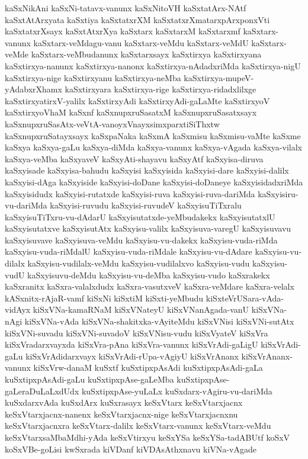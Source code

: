 {kaSxNikAni
kaSxNi-tatavx-vanunx
kaSxNitoVH
kaSxtatArx-NAtf
kaSxtAtArxyata
kaSxtiya
kaSxtatxrXM
kaSxtatxrXmatarxpArxponxVti
kaSxtatxrXsayx
kaSxtAtxrXya
kaSxtarx
kaSxtarxM
kaSxtarxmf
kaSxtarx-vanunx
kaSxtarx-veMdagu-vanu
kaSxtarx-veMdu
kaSxtarx-veMdU
kaSxtarx-veMde
kaSxtarx-veMbudanunx
kaSxtarxsayx
kaSxtirxya
kaSxtirxyana
kaSxtirxya-nanunx
kaSxtirxya-nanonx
kaSxtirxya-nAdadxriMda
kaSxtirxya-nigU
kaSxtirxya-nige
kaSxtirxyanu
kaSxtirxya-neMba
kaSxtirxya-mupeV-yAdabxrXhamx
kaSxtirxyara
kaSxtirxya-rige
kaSxtirxya-ridadxlilxge
kaSxtirxyatirxV-yalilx
kaSxtirxyAdi
kaSxtirxyAdi-gaLaMte
kaSxtirxyoV
kaSxtirxyoVhaM
kaSxnf
kaSxnupxruSasatxM
kaSxnupxruSasatxsayx
kaSxnupxruSasAtx-veVtA-vanoyxVnayxsimxparxtiSiThxtw
kaSxnupxruSatayxsayx
kaSxpaNaka
kaSxmA
kaSxmisu
kaSxmisu-vaMte
kaSxme
kaSxya
kaSxya-gaLu
kaSxya-diMda
kaSxya-vanunx
kaSxya-vAgada
kaSxya-vilalx
kaSxya-veMba
kaSxyaveV
kaSxyAti-shayavu
kaSxyAtf
kaSxyisa-diruva
kaSxyisade
kaSxyisa-bahudu
kaSxyisi
kaSxyisida
kaSxyisi-dare
kaSxyisi-dalilx
kaSxyisi-dAga
kaSxyiside
kaSxyisi-doDane
kaSxyisi-doDaneye
kaSxyisidadxriMda
kaSxyisidudx
kaSxyisi-rutatxde
kaSxyisi-ruva
kaSxyisi-ruva-dariMda
kaSxyisiru-vu-dariMda
kaSxyisi-ruvudu
kaSxyisi-ruvudeV
kaSxyisuTiTxralu
kaSxyisuTiTxru-vu-dAdarU
kaSxyisutatxde-yeMbudakekx
kaSxyisutatxlU
kaSxyisutatxve
kaSxyisutAtx
kaSxyisu-valilx
kaSxyisuva-varegU
kaSxyisuvavu
kaSxyisuvave
kaSxyisuva-veMdu
kaSxyisu-vu-dakekx
kaSxyisu-vuda-riMda
kaSxyisu-vuda-riMdalU
kaSxyisu-vuda-riMdale
kaSxyisu-vu-dAdare
kaSxyisu-vu-dilalx
kaSxyisu-vudilalx-veMdu
kaSxyisu-vudilalxvo
kaSxyisu-vudu
kaSxyisu-vudU
kaSxyisuvu-deMdu
kaSxyisu-vu-deMba
kaSxyisu-vudo
kaSxrakekx
kaSxranitx
kaSxra-valalxdudx
kaSxra-vasutxveV
kaSxra-veMdare
kaSxra-velalx
kASxnitx-rAjaR-vamf
kiSxNi
kiSxtiM
kiSxti-yeMbudu
kiSxteVrUSara-vAda-vidAyx
kiSxVNa-kamaRNaM
kiSxVNateyU
kiSxVNanAgada-vanU
kiSxVNa-nAgi
kiSxVNa-vAda
kiSxVNa-shakitxka-vAyiteMdu
kiSxVNisi
kiSxVNi-sutAtx
kiSxVNi-suvadu
kiSxVNi-suvadoV
kiSxVNisu-vudu
kiSxVyateV
kiSxVra
kiSxVradarxvayxda
kiSxVra-pAna
kiSxVra-vanunx
kiSxVrAdi-gaLigU
kiSxVrAdi-gaLu
kiSxVrAdidarxvayx
kiSxVrAdi-rUpa-vAgiyU
kiSxVrAnanx
kiSxVrAnanx-vanunx
kiSxVrw-danaM
kuSxtf
kuSxtipxpAsAdi
kuSxtipxpAsAdi-gaLa
kuSxtipxpAsAdi-gaLu
kuSxtipxpAse-gaLeMba
kuSxtipxpAse-gaLeraDuLaLxdUdx
kuSxtipxpAse-yuLaLx
kuSxdarx-vAgiru-vu-dariMda
kuSxdarxvAda
kuSxdArx
kuSxrasayx
keSxVtarx
keSxVtarxjacnx
keSxVtarxjacnx-nanenx
keSxVtarxjacnx-nige
keSxVtarxjacnxnu
keSxVtarxjacnxra
keSxVtarx-dalilx
keSxVtarx-vanunx
keSxVtarx-veMdu
keSxVtarxsaMbaMdhi-yAda
keSxVtirxyu
keSxYSa
keSxYSa-tadABUtf
koSxV
koSxVBe-goLisi
kwSxrada
kiVDanf
kiVDAsAthxnavu
kiVNa-vAgade
}
